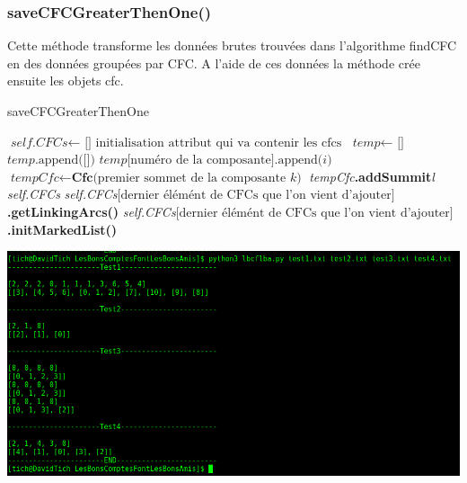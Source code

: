 \documentclass[a4paper]{article}
\begin{document}
\subsubsection{saveCFCGreaterThenOne()}
Cette méthode transforme les données brutes trouvées dans l'algorithme findCFC en des données groupées par CFC. A l'aide de ces données la méthode crée ensuite les objets cfc.
\begin{algorithm}[H]
\caption{saveCFCGreaterThenOne}\label{save}
\begin{algorithmic}[1]
\State $\textit{self.CFCs} \gets \text{ [] initialisation attribut qui va contenir les cfcs} $
\State $\textit{temp} \gets \text{ []} $
\State $\textit{temp}\text{.append([])}$
\EndFor
\EndIf
\State $\textit{temp}\text{[numéro de la composante].append(}\textit{i}\text{)}$
\EndFor
{}
\State $\textit{tempCfc} \gets \textbf{Cfc}\text{(premier sommet de la composante}\textit{ k}\text{)}$
\State \textit{tempCfc}\textbf{.addSummit}\textit{l}
\EndFor
\State \textit{self.CFCs}
\State \textit{self.CFCs}$\text{[dernier élémént de CFCs que l'on vient d'ajouter]}$\textbf{.getLinkingArcs()}
\State \textit{self.CFCs}$\text{[dernier élémént de CFCs que l'on vient d'ajouter]}$\textbf{.initMarkedList()}
\EndIf
\EndFor
\EndProcedure
\end{algorithmic}
\end{algorithm}
\includegraphics[scale=0.4]{save.png}\\
\end{document}
